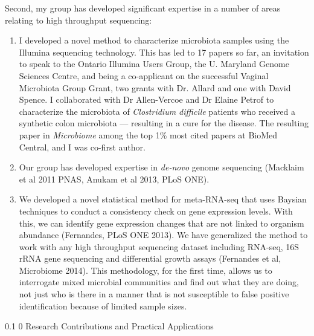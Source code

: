 \documentclass[12pt]{article}
\makeatletter
\renewcommand\section{\@startsection
	{section}{1}{0in}%
	{0.1\baselineskip}%
	{0\baselineskip}%
	{\sffamily\bfseries\large}
}
\makeatother
\begin{document}
Second, my group has developed significant expertise in a number of areas relating to high throughput sequencing:
\begin{enumerate} \setlength{\itemsep}{-4pt} 
\item I developed a novel method to characterize microbiota samples using the Illumina sequencing technology. This has led to 17 papers so far, an invitation to speak to the Ontario Illumina Users Group, the U. Maryland Genome Sciences Centre, and being a co-applicant on the successful Vaginal Microbiota Group Grant, two grants with Dr. Allard and one with David Spence. I collaborated with Dr Allen-Vercoe and Dr Elaine Petrof to characterize the microbiota of {\em Clostridium difficile} patients who  received a synthetic colon microbiota --- resulting in a cure for the disease. The resulting paper in {\em Microbiome} among the top 1\% most cited papers at BioMed Central, and I was co-first author.
\item Our group has developed expertise in {\em de-novo} genome sequencing (Macklaim et al 2011 PNAS, Anukam et al 2013, PLoS ONE).
\item We developed a novel statistical method for meta-RNA-seq that uses Baysian techniques to conduct a consistency check on gene expression levels. With this, we can identify gene expression changes that are not linked to organism abundance (Fernandes, PLoS ONE 2013). We have generalized the method to work with any high throughput sequencing dataset including RNA-seq, 16S rRNA gene sequencing and differential growth assays (Fernandes et al, Microbiome 2014). This methodology, for the first time, allows us to interrogate mixed microbial communities and find out what they are doing, not just who is there in a manner that is not susceptible to false positive identification because of limited sample sizes.
\end{enumerate}
\newpage
\section{Research Contributions and Practical Applications}
\end{document}
